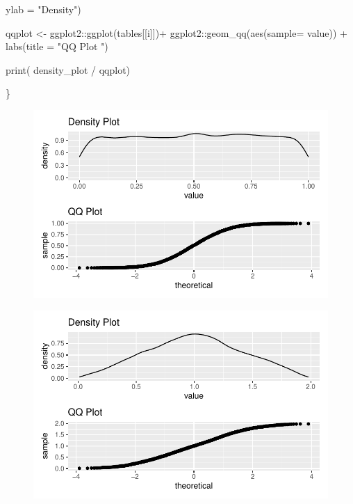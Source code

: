 \documentclass[
  letterpaper,
  DIV=11,
  numbers=noendperiod]{scrartcl}
\newenvironment{Shaded}{\begin{snugshade}}{\end{snugshade}}
\newcommand{\AttributeTok}[1]{\textcolor[rgb]{0.40,0.45,0.13}{#1}}
\newcommand{\FunctionTok}[1]{\textcolor[rgb]{0.28,0.35,0.67}{#1}}
\newcommand{\NormalTok}[1]{\textcolor[rgb]{0.00,0.23,0.31}{#1}}
\newcommand{\OtherTok}[1]{\textcolor[rgb]{0.00,0.23,0.31}{#1}}
\newcommand{\SpecialCharTok}[1]{\textcolor[rgb]{0.37,0.37,0.37}{#1}}
\newcommand{\StringTok}[1]{\textcolor[rgb]{0.13,0.47,0.30}{#1}}
\begin{document}
\begin{Shaded}
\begin{Highlighting}[]
       \AttributeTok{ylab =} \StringTok{"Density"}\NormalTok{)}
  
\NormalTok{  qqplot }\OtherTok{\textless{}{-}}\NormalTok{   ggplot2}\SpecialCharTok{::}\FunctionTok{ggplot}\NormalTok{(tables[[i]])}\SpecialCharTok{+}
\NormalTok{  ggplot2}\SpecialCharTok{::}\FunctionTok{geom\_qq}\NormalTok{(}\FunctionTok{aes}\NormalTok{(}\AttributeTok{sample=}\NormalTok{ value)) }\SpecialCharTok{+}
    \FunctionTok{labs}\NormalTok{(}\AttributeTok{title =} \StringTok{"QQ Plot "}\NormalTok{)}
  
  \FunctionTok{print}\NormalTok{( density\_plot }\SpecialCharTok{/}\NormalTok{ qqplot)}


\NormalTok{\}}
\end{Highlighting}
\end{Shaded}

\begin{figure}[H]

{\centering \includegraphics{HW04_Gaughan_Melissa_files/figure-pdf/3c-1.pdf}

}

\end{figure}

\begin{figure}[H]

{\centering \includegraphics{HW04_Gaughan_Melissa_files/figure-pdf/3c-2.pdf}

}

\end{figure}
\end{document}
